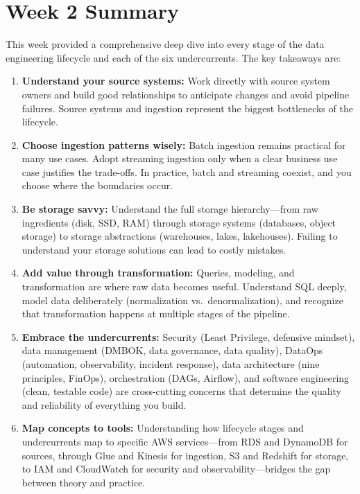 \documentclass{article}
\begin{document}
\section{Week 2 Summary}
This week provided a comprehensive deep dive into every stage of the data engineering lifecycle and each of the six undercurrents. The key takeaways are:
\begin{enumerate}
    \item \textbf{Understand your source systems:} Work directly with source system owners and build good relationships to anticipate changes and avoid pipeline failures. Source systems and ingestion represent the biggest bottlenecks of the lifecycle.

    \item \textbf{Choose ingestion patterns wisely:} Batch ingestion remains practical for many use cases. Adopt streaming ingestion only when a clear business use case justifies the trade-offs. In practice, batch and streaming coexist, and you choose where the boundaries occur.

    \item \textbf{Be storage savvy:} Understand the full storage hierarchy---from raw ingredients (disk, SSD, RAM) through storage systems (databases, object storage) to storage abstractions (warehouses, lakes, lakehouses). Failing to understand your storage solutions can lead to costly mistakes.

    \item \textbf{Add value through transformation:} Queries, modeling, and transformation are where raw data becomes useful. Understand SQL deeply, model data deliberately (normalization vs.\ denormalization), and recognize that transformation happens at multiple stages of the pipeline.

    \item \textbf{Embrace the undercurrents:} Security (Least Privilege, defensive mindset), data management (DMBOK, data governance, data quality), DataOps (automation, observability, incident response), data architecture (nine principles, FinOps), orchestration (DAGs, Airflow), and software engineering (clean, testable code) are cross-cutting concerns that determine the quality and reliability of everything you build.

    \item \textbf{Map concepts to tools:} Understanding how lifecycle stages and undercurrents map to specific AWS services---from RDS and DynamoDB for sources, through Glue and Kinesis for ingestion, S3 and Redshift for storage, to IAM and CloudWatch for security and observability---bridges the gap between theory and practice.
\end{enumerate}
\end{document}
